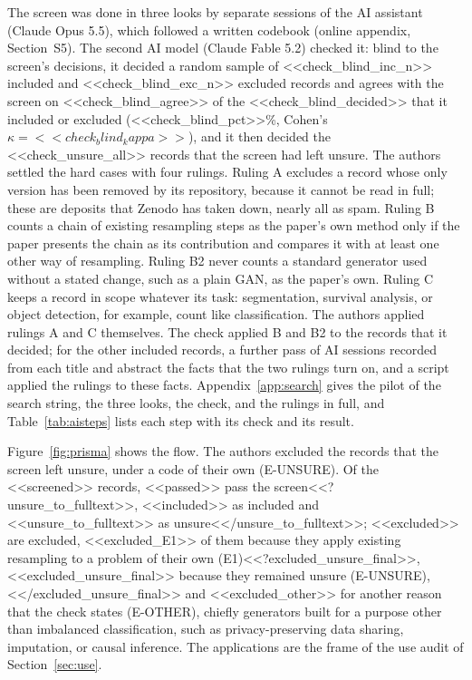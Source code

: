The screen was done in three looks by separate sessions of the AI assistant (Claude Opus 5.5), which followed a written codebook (online appendix, Section~S5). The second AI model (Claude Fable 5.2) checked it: blind to the screen's decisions, it decided a random sample of <<check_blind_inc_n>> included and <<check_blind_exc_n>> excluded records and agrees with the screen on <<check_blind_agree>> of the <<check_blind_decided>> that it included or excluded (<<check_blind_pct>>\%, Cohen's $\kappa = <<check_blind_kappa>>$), and it then decided the <<check_unsure_all>> records that the screen had left unsure. The authors settled the hard cases with four rulings. Ruling A excludes a record whose only version has been removed by its repository, because it cannot be read in full; these are deposits that Zenodo has taken down, nearly all as spam. Ruling B counts a chain of existing resampling steps as the paper's own method only if the paper presents the chain as its contribution and compares it with at least one other way of resampling. Ruling B2 never counts a standard generator used without a stated change, such as a plain GAN, as the paper's own. Ruling C keeps a record in scope whatever its task: segmentation, survival analysis, or object detection, for example, count like classification. The authors applied rulings A and C themselves. The check applied B and B2 to the records that it decided; for the other included records, a further pass of AI sessions recorded from each title and abstract the facts that the two rulings turn on, and a script applied the rulings to these facts. Appendix~\ref{app:search} gives the pilot of the search string, the three looks, the check, and the rulings in full, and Table~\ref{tab:aisteps} lists each step with its check and its result.

Figure~\ref{fig:prisma} shows the flow. The authors excluded the records that the screen left unsure, under a code of their own (E-UNSURE). Of the <<screened>> records, <<passed>> pass the screen<<?unsure_to_fulltext>>, <<included>> as included and <<unsure_to_fulltext>> as unsure<</unsure_to_fulltext>>; <<excluded>> are excluded, <<excluded_E1>> of them because they apply existing resampling to a problem of their own (E1)<<?excluded_unsure_final>>, <<excluded_unsure_final>> because they remained unsure (E-UNSURE),<</excluded_unsure_final>> and <<excluded_other>> for another reason that the check states (E-OTHER), chiefly generators built for a purpose other than imbalanced classification, such as privacy-preserving data sharing, imputation, or causal inference. The applications are the frame of the use audit of Section~\ref{sec:use}.
